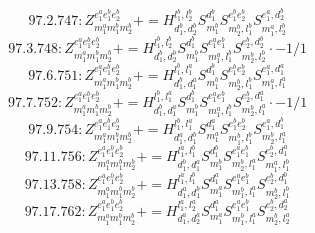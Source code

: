 \documentclass[letterpaper,10pt,fleqn,leqno,onecolumn]{article}
\begin{document}
\begin{equation} \;\;\;\;\;\;  97.2.747: Z^{e_{1}^{a}e_{1}^{b}e_{2}^{b}}_{m_{1}^{a}m_{1}^{b}m_{2}^{b}}+=H^{l_{1}^{b},l_{2}^{b}}_{d_{1}^{b},d_{2}^{b}}S^{d_{1}^{b}}_{m_{1}^{b}}S^{e_{1}^{b}e_{2}^{b}}_{m_{2}^{b},l_{1}^{b}}S^{e_{1}^{a},d_{2}^{b}}_{m_{1}^{a},l_{2}^{b}} \end{equation}
\begin{equation} \;\;\;\;\;\;  97.3.748: Z^{e_{1}^{a}e_{1}^{b}e_{2}^{b}}_{m_{1}^{a}m_{1}^{b}m_{2}^{b}}+=H^{l_{1}^{b},l_{2}^{b}}_{d_{1}^{b},d_{2}^{b}}S^{d_{1}^{b}}_{m_{1}^{b}}S^{e_{1}^{a}e_{1}^{b}}_{m_{1}^{a},l_{1}^{b}}S^{e_{2}^{b},d_{2}^{b}}_{m_{2}^{b},l_{2}^{b}}\cdot -1/1 \end{equation}
\begin{equation} \;\;\;\;\;\;  97.6.751: Z^{e_{1}^{a}e_{1}^{b}e_{2}^{b}}_{m_{1}^{a}m_{1}^{b}m_{2}^{b}}+=H^{l_{1}^{b},l_{1}^{a}}_{d_{1}^{b},d_{1}^{a}}S^{d_{1}^{b}}_{m_{1}^{b}}S^{e_{1}^{b}e_{2}^{b}}_{m_{2}^{b},l_{1}^{b}}S^{e_{1}^{a},d_{1}^{a}}_{m_{1}^{a},l_{1}^{a}} \end{equation}
\begin{equation} \;\;\;\;\;\;  97.7.752: Z^{e_{1}^{a}e_{1}^{b}e_{2}^{b}}_{m_{1}^{a}m_{1}^{b}m_{2}^{b}}+=H^{l_{1}^{b},l_{1}^{a}}_{d_{1}^{b},d_{1}^{a}}S^{d_{1}^{b}}_{m_{1}^{b}}S^{e_{1}^{a}e_{1}^{b}}_{m_{1}^{a},l_{1}^{b}}S^{e_{2}^{b},d_{1}^{a}}_{m_{2}^{b},l_{1}^{a}}\cdot -1/1 \end{equation}
\begin{equation} \;\;\;\;\;\;  97.9.754: Z^{e_{1}^{a}e_{1}^{b}e_{2}^{b}}_{m_{1}^{a}m_{1}^{b}m_{2}^{b}}+=H^{l_{1}^{b},l_{1}^{a}}_{d_{1}^{a},d_{1}^{b}}S^{d_{1}^{a}}_{m_{1}^{a}}S^{e_{1}^{b}e_{2}^{b}}_{m_{1}^{b},l_{1}^{b}}S^{e_{1}^{a},d_{1}^{b}}_{m_{2}^{b},l_{1}^{a}} \end{equation}
\begin{equation} \;\;\;\;\;\;  97.11.756: Z^{e_{1}^{a}e_{1}^{b}e_{2}^{b}}_{m_{1}^{a}m_{1}^{b}m_{2}^{b}}+=H^{l_{1}^{a},l_{1}^{b}}_{d_{1}^{b},d_{1}^{a}}S^{d_{1}^{b}}_{m_{1}^{b}}S^{e_{1}^{a}e_{1}^{b}}_{m_{2}^{b},l_{1}^{a}}S^{e_{2}^{b},d_{1}^{a}}_{m_{1}^{a},l_{1}^{b}} \end{equation}
\begin{equation} \;\;\;\;\;\;  97.13.758: Z^{e_{1}^{a}e_{1}^{b}e_{2}^{b}}_{m_{1}^{a}m_{1}^{b}m_{2}^{b}}+=H^{l_{1}^{a},l_{1}^{b}}_{d_{1}^{a},d_{1}^{b}}S^{d_{1}^{a}}_{m_{1}^{a}}S^{e_{1}^{a}e_{1}^{b}}_{m_{1}^{b},l_{1}^{a}}S^{e_{2}^{b},d_{1}^{b}}_{m_{2}^{b},l_{1}^{b}} \end{equation}
\begin{equation} \;\;\;\;\;\;  97.17.762: Z^{e_{1}^{a}e_{1}^{b}e_{2}^{b}}_{m_{1}^{a}m_{1}^{b}m_{2}^{b}}+=H^{l_{1}^{a},l_{2}^{a}}_{d_{1}^{a},d_{2}^{a}}S^{d_{1}^{a}}_{m_{1}^{a}}S^{e_{1}^{a}e_{1}^{b}}_{m_{1}^{b},l_{1}^{a}}S^{e_{2}^{b},d_{2}^{a}}_{m_{2}^{b},l_{2}^{a}} \end{equation}
\end{document}
